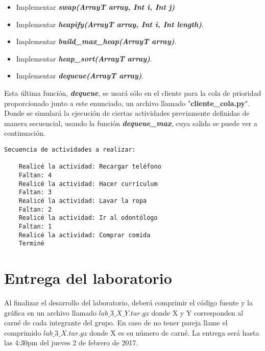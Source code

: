 \documentclass[11pt,letterpaper]{article}
\begin{document}
\begin{itemize}
    \item Implementar \textbf{\textit{swap(ArrayT array, Int i, Int j)}}
    \item Implementar \textbf{\textit{heapify(ArrayT array, Int i, Int length)}}.
    \item Implementar \textbf{\textit{build\_max\_heap(ArrayT array)}}.
    \item Implementar \textbf{\textit{heap\_sort(ArrayT array)}}.
    \item Implementar \textbf{\textit{dequeue(ArrayT array)}}.
\end{itemize}

Esta última función, \textbf{\textit{dequeue}}, se usará sólo en el cliente para la cola de prioridad proporcionado junto a este enunciado, un archivo llamado "\textbf{cliente\_cola.py}". Donde se simulará la ejecución de ciertas actividades previamente definidas de manera secuencial, usando la función \textbf{\textit{dequeue\_max}}, cuya salida se puede ver a continuación.

\vspace{1em}

\begin{center}
\begin{lstlisting}[frame=single]
    Secuencia de actividades a realizar:

    Realicé la actividad: Recargar teléfono
    Faltan: 4
    Realicé la actividad: Hacer currículum
    Faltan: 3
    Realicé la actividad: Lavar la ropa
    Faltan: 2
    Realicé la actividad: Ir al odontólogo
    Faltan: 1
    Realicé la actividad: Comprar comida
    Terminé
\end{lstlisting}
\end{center}

\section*{Entrega del laboratorio}

Al finalizar el desarrollo del laboratorio, deberá comprimir el código fuente y la gráfica en un archivo llamado $lab\_3\_X\_Y.tar.gz$ donde X y Y corresponden al carné de cada integrante del grupo. En caso de no tener pareja llame el comprimido $lab\_3\_X.tar.gz$ donde X es su número de carné. La entrega será hasta las 4:30pm del jueves 2 de febrero de 2017.
\end{document}
